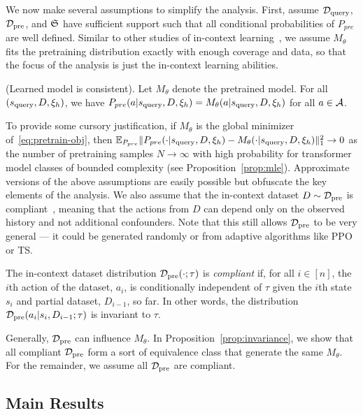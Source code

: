 We now make several assumptions to simplify the analysis. First, assume $\mathcal{D}_{\text{query}}$, $\mathcal{D}_{\text{pre}}$, and ${\mathfrak{S}}$ have sufficient support such that all conditional probabilities of $P_{pre}$ are well defined. Similar to other studies of in-context learning~\citep{xie2021explanation}, we assume $M_{\theta}$ fits the pretraining distribution exactly with enough coverage and data, so that the focus of the analysis is just the in-context learning abilities.
\begin{assumption}\label{asmp:equality}
(Learned model is consistent). Let $M_{\theta}$ denote the pretrained model. For all $(s_{\text{query}}, D, \xi_h)$,
we have $P_{pre}(a | s_{\text{query}}, D, \xi_h) = M_{\theta}( a | s_{\text{query}}, D, \xi_h)$ for all $a \in \mathcal{A}$.
\end{assumption}
To provide some cursory justification, if $M_{\theta}$ is the global minimizer of~\eqref{eq:pretrain-obj}, then $\mathbb{E}_{P_{pre}} \| P_{pre}(\cdot |s_{\text{query}},  D, \xi_h)  - M_{\theta}(\cdot |  s_{\text{query}}, D, \xi_h) \|_1^2 \rightarrow  0$ as the number of pretraining samples $N \rightarrow \infty$ with high probability for transformer model classes of bounded complexity (see Proposition~\ref{prop:mle}). Approximate versions of the above  %
 assumptions are easily possible but obfuscate the key elements of the analysis.
We also assume that the in-context dataset $D \sim \mathcal{D}_{\text{pre}}$ is compliant~\citep{jin2021pessimism}, meaning that the actions from $D$ can depend only on the observed history and not additional confounders. Note that this still allows $\mathcal{D}_{\text{pre}}$ to be very general --- it could be generated randomly or from adaptive algorithms like PPO or TS.

\begin{definition}[Compliance]\label{def:compliant}
    The in-context dataset distribution $\mathcal{D}_{\text{pre}}(\cdot; \tau)$ is \emph{compliant} if, for all $i \in [n]$, the $i$th action of the dataset, $a_i$, is conditionally independent of $\tau$ given the $i$th state $s_i$ and partial dataset, $D_{i - 1}$, so far. In other words, the distribution $\mathcal{D}_{\text{pre}}(a_i | s_i, D_{i - 1}; \tau)$ is invariant to $\tau$.
\end{definition}

Generally, $\mathcal{D}_{\text{pre}}$ can influence $M_{\theta}$. In Proposition~\ref{prop:invariance}, we show that all compliant $\mathcal{D}_{\text{pre}}$ form a sort of equivalence class that generate the same $M_{\theta}$. For the remainder, we assume all $\mathcal{D}_{\text{pre}}$ are compliant.

\subsection{Main Results}

